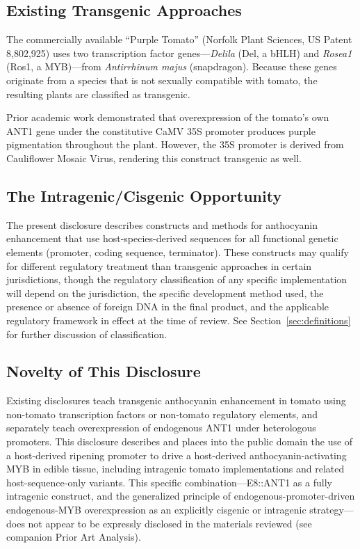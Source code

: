\documentclass[12pt,a4paper]{article}
\begin{document}
\subsection{Existing Transgenic Approaches}

The commercially available ``Purple Tomato'' (Norfolk Plant Sciences, US Patent 8,802,925) uses two transcription factor genes---\textit{Delila} (Del, a bHLH) and \textit{Rosea1} (Ros1, a MYB)---from \textit{Antirrhinum majus} (snapdragon). Because these genes originate from a species that is not sexually compatible with tomato, the resulting plants are classified as transgenic.

Prior academic work \citep{Mathews2003} demonstrated that overexpression of the tomato's own ANT1 gene under the constitutive CaMV 35S promoter produces purple pigmentation throughout the plant. However, the 35S promoter is derived from Cauliflower Mosaic Virus, rendering this construct transgenic as well.

\subsection{The Intragenic/Cisgenic Opportunity}

The present disclosure describes constructs and methods for anthocyanin enhancement that use host-species-derived sequences for all functional genetic elements (promoter, coding sequence, terminator). These constructs may qualify for different regulatory treatment than transgenic approaches in certain jurisdictions, though the regulatory classification of any specific implementation will depend on the jurisdiction, the specific development method used, the presence or absence of foreign DNA in the final product, and the applicable regulatory framework in effect at the time of review. See Section~\ref{sec:definitions} for further discussion of classification.

\subsection{Novelty of This Disclosure}
\label{sec:novelty}

Existing disclosures teach transgenic anthocyanin enhancement in tomato using non-tomato transcription factors or non-tomato regulatory elements, and separately teach overexpression of endogenous ANT1 under heterologous promoters. This disclosure describes and places into the public domain the use of a host-derived ripening promoter to drive a host-derived anthocyanin-activating MYB in edible tissue, including intragenic tomato implementations and related host-sequence-only variants. This specific combination---E8::ANT1 as a fully intragenic construct, and the generalized principle of endogenous-promoter-driven endogenous-MYB overexpression as an explicitly cisgenic or intragenic strategy---does not appear to be expressly disclosed in the materials reviewed (see companion Prior Art Analysis).
\end{document}
